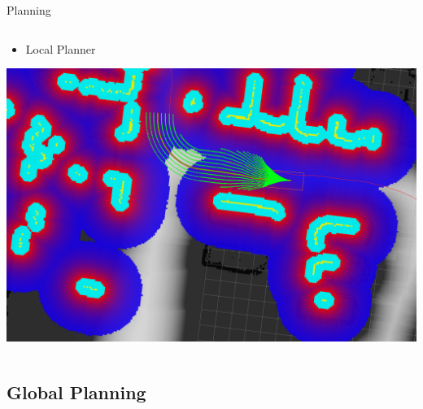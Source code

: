 \begin{frame}{Planning}
\begin{columns}[c]
\begin{overlayarea}{\textwidth}{\textheight}
\begin{itemize}
	\item Local Planner
	\end{itemize}
	\includegraphics[width=\textwidth]{example14}
	\end{overlayarea}
  \end{columns}
\end{frame}

\subsection{Global Planning}

